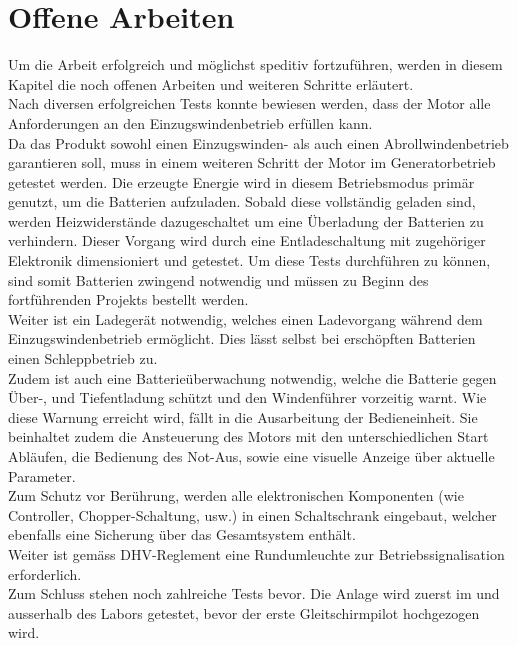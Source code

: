 \section{Offene Arbeiten}
Um die Arbeit erfolgreich und möglichst speditiv fortzuführen, werden in diesem Kapitel die noch offenen Arbeiten und weiteren Schritte erläutert.\\

Nach diversen erfolgreichen Tests konnte bewiesen werden, dass der Motor alle Anforderungen an den Einzugswindenbetrieb erfüllen kann.\\
Da das Produkt sowohl einen Einzugswinden- als auch einen Abrollwindenbetrieb garantieren soll, muss in einem weiteren Schritt der Motor im Generatorbetrieb getestet werden. Die erzeugte Energie wird in diesem Betriebsmodus primär genutzt, um die Batterien aufzuladen. Sobald diese vollständig geladen sind, werden Heizwiderstände dazugeschaltet um eine Überladung der Batterien zu verhindern. Dieser Vorgang wird durch eine Entladeschaltung mit zugehöriger Elektronik dimensioniert und getestet. Um diese Tests durchführen zu können, sind somit Batterien zwingend notwendig und müssen zu Beginn des fortführenden Projekts bestellt werden.\\
Weiter ist ein Ladegerät notwendig, welches einen Ladevorgang während dem Einzugswindenbetrieb ermöglicht. Dies lässt selbst bei erschöpften Batterien einen Schleppbetrieb zu.\\
Zudem ist auch eine Batterieüberwachung notwendig, welche die Batterie gegen Über-, und Tiefentladung schützt und den Windenführer vorzeitig warnt. Wie diese Warnung erreicht wird, fällt in die Ausarbeitung der Bedieneinheit. Sie beinhaltet zudem die Ansteuerung des Motors mit den unterschiedlichen Start Abläufen, die Bedienung des Not-Aus, sowie eine visuelle Anzeige über aktuelle Parameter.\\
Zum Schutz vor Berührung, werden alle elektronischen Komponenten (wie Controller, Chopper-Schaltung, usw.) in einen Schaltschrank eingebaut, welcher ebenfalls eine Sicherung über das Gesamtsystem enthält.\\
Weiter ist gemäss DHV-Reglement eine Rundumleuchte zur Betriebssignalisation erforderlich.\\
Zum Schluss stehen noch zahlreiche Tests bevor. Die Anlage wird zuerst im und ausserhalb des Labors getestet, bevor der erste Gleitschirmpilot hochgezogen wird.